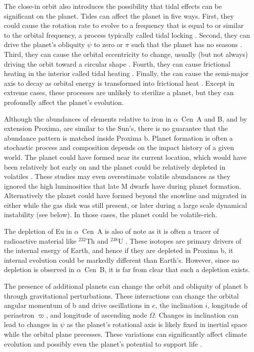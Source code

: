 \documentclass[preprint,12pt]{aastex}
\def\acen{{$\alpha$~Cen}}
\begin{document}
The close-in orbit also introduces the possibility that tidal effects
can be significant on the planet. Tides can affect the planet in five
ways. First, they could cause the rotation rate to evolve to a
frequency that is equal to or similar to the orbital frequency, a
process typically called tidal locking
\citep{Dole64,Kasting93,Barnes16}. Second, they can drive the planet's
obliquity $\psi$ to zero or $\pi$ such that the planet has no seasons
\citep{Heller11}. Third, they can cause the orbital eccentricity to
change, usually (but not always) driving the orbit toward a circular
shape \citep{Darwin1880}. Fourth, they can cause frictional heating in
the interior called tidal heating
\citep{Peale79,Jackson08c,Barnes13}. Finally, the can cause the
semi-major axis to decay as orbital energy is transformed into
frictional heat \citep{Darwin1880,Barnes08}. Except in extreme cases,
these processes are unlikely to sterilize a planet, but they can
profoundly affect the planet's evolution.

Although the abundances of elements relative to iron in \acen~A and B,
and by extension Proxima, are similar to the Sun's, there is no
guarantee that the abundance pattern is matched inside Proxima
b. Planet formation is often a stochastic process and composition
depends on the impact history of a given world. The planet could have
formed near its current location, which would have been relatively hot
early on and the planet could be relatively depleted in volatiles
\citep{Raymond07,Mulders15}. These studies may even overestimate
volatile abundances as they ignored the high luminosities that late M
dwarfs have during planet formation. Alternatively the planet could
have formed beyond the snowline and migrated in either while the gas
disk was still present, or later during a large scale dynamical
instability (see below). In those cases, the planet could be
volatile-rich.

The depletion of Eu in \acen~A is also of note as it is often a tracer
of radioactive material like $^{232}$Th and $^{238}$U
\citep{Young14}. These isotopes are primary drivers of the internal
energy of Earth, and hence if they are depleted in Proxima b, it
internal evolution could be markedly different than Earth's. However,
since no depletion is observed in \acen~B, it is far from clear that
such a depletion exists.

The presence of additional planets can change the orbit and obliquity
of planet b through gravitational perturbations. These interactions
can change the orbital angular momentum of b and drive oscillations in
$e$, the inclination $i$, longitude of periastron $\varpi$, and
longitude of ascending node $\Omega$. Changes in inclination can lead
to changes in $\psi$ as the planet's rotational axis is likely fixed
in inertial space while the orbital plane precesses. These variations
can significantly affect climate evolution and possibly even the
planet's potential to support life \citep{Armstrong14}.
\end{document}
